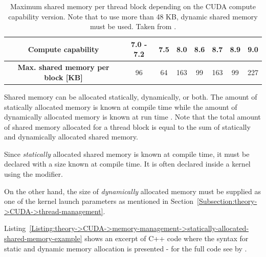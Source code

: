 \begin{table}[ht!]
	\centering
	\begin{tabular}{|c|c|c|c|c|c|c|c|}
		\hline
		\cellcolor[HTML]{C0C0C0}\textbf{Compute capability}                & 7.0 - 7.2 & 7.5 & 8.0 & 8.6 & 8.7 & 8.9 & 9.0 \\ \hline
		\cellcolor[HTML]{C0C0C0}\textbf{Max. shared memory per block [KB]} &    96     & 64  & 163 & 99  & 163 & 99  & 227 \\ \hline
	\end{tabular}
	\caption{Maximum shared memory per thread block depending on the CUDA compute capability version.
		Note that to use more than 48 KB, dynamic shared memory must be used.
		Taken from  \cite{NVIDIADecember2022}.
	}
	\label{Table:theory->CUDA->memory-management->max-shared-memory-per-block-based-on-compute-capability}
\end{table}

Shared memory can be allocated statically, dynamically, or both.
The amount of statically allocated memory is known at compile time while the amount of dynamically allocated memory is known at run time \cite{Harris28January2013}.
Note that the total amount of shared memory allocated for a thread block is equal to the sum of statically and dynamically allocated shared memory.

Since \textit{statically} allocated shared memory is known at compile time, it must be declared with a size known at compile time.
It is often declared inside a kernel using the  modifier.

On the other hand, the size of \textit{dynamically} allocated memory must be supplied as one of the kernel launch parameters as mentioned in Section~\ref{Subsection:theory->CUDA->thread-management}.

Listing~\ref{Listing:theory->CUDA->memory-management->statically-allocated-shared-memory-example} shows an excerpt of C++ code where the syntax for static and dynamic memory allocation is presented - for the full code see  by  \cite{Harris28January2013}.

